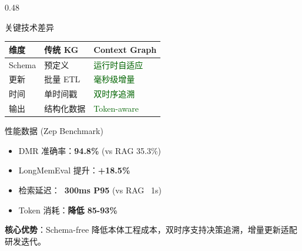 \documentclass[aspectratio=169,10pt]{beamer}
\begin{document}
\begin{frame}
\begin{columns}[T]
    \begin{column}{0.48\textwidth}
      \begin{block}{关键技术差异}
        \scriptsize
        \begin{tabular}{lll}
        \toprule
        \textbf{维度} & \textbf{传统 KG} & \textbf{Context Graph} \\
        \midrule
        Schema & 预定义 & \textcolor{darkgreen}{运行时自适应} \\
        更新 & 批量 ETL & \textcolor{darkgreen}{毫秒级增量} \\
        时间 & 单时间戳 & \textcolor{darkgreen}{双时序追溯} \\
        输出 & 结构化数据 & \textcolor{darkgreen}{Token-aware} \\
        \bottomrule
        \end{tabular}
      \end{block}

      \vspace{0.05cm}

      \begin{block}{性能数据 (Zep Benchmark)}
        \scriptsize
        \begin{itemize}
            \item DMR 准确率：\textbf{94.8\%} (vs RAG 35.3\%)
            \item LongMemEval 提升：\textbf{+18.5\%}
            \item 检索延迟：\textbf{~300ms P95} (vs RAG ~1s)
            \item Token 消耗：\textbf{降低 85-93\%}
        \end{itemize}
      \end{block}

      \vspace{0.05cm}
      \begin{tcolorbox}[colback=layer1]
        \scriptsize
        \textbf{核心优势}：Schema-free 降低本体工程成本，双时序支持决策追溯，增量更新适配研发迭代。
      \end{tcolorbox}
    \end{column}
  \end{columns}
\end{frame}
\end{document}
